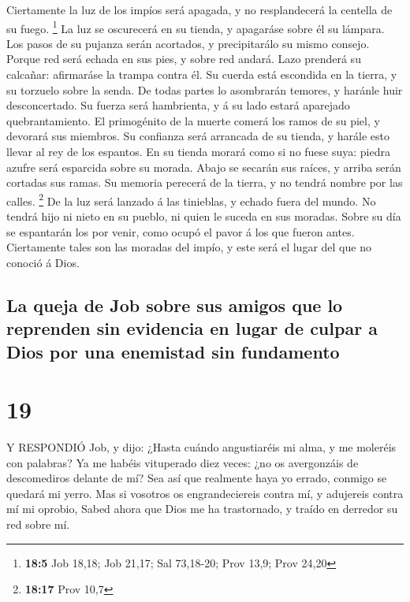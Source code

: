  Ciertamente la luz de los impíos será apagada, y no
resplandecerá la centella de su fuego. \footnote{\textbf{18:5} Job
  18,18; Job 21,17; Sal 73,18-20; Prov 13,9; Prov 24,20}  La
luz se oscurecerá en su tienda, y apagaráse sobre él su lámpara.
 Los pasos de su pujanza serán acortados, y precipitarálo su
mismo consejo.  Porque red será echada en sus pies, y sobre
red andará.  Lazo prenderá su calcañar: afirmaráse la trampa
contra él.  Su cuerda está escondida en la tierra, y su
torzuelo sobre la senda.  De todas partes lo asombrarán
temores, y haránle huir desconcertado.  Su fuerza será
hambrienta, y á su lado estará aparejado quebrantamiento. 
El primogénito de la muerte comerá los ramos de su piel, y devorará sus
miembros.  Su confianza será arrancada de su tienda, y
harále esto llevar al rey de los espantos.  En su tienda
morará como si no fuese suya: piedra azufre será esparcida sobre su
morada.  Abajo se secarán sus raíces, y arriba serán
cortadas sus ramas.  Su memoria perecerá de la tierra, y no
tendrá nombre por las calles. \footnote{\textbf{18:17} Prov 10,7}
 De la luz será lanzado á las tinieblas, y echado fuera del
mundo.  No tendrá hijo ni nieto en su pueblo, ni quien le
suceda en sus moradas.  Sobre su día se espantarán los por
venir, como ocupó el pavor á los que fueron antes. 
Ciertamente tales son las moradas del impío, y este será el lugar del
que no conoció á Dios.

\hypertarget{la-queja-de-job-sobre-sus-amigos-que-lo-reprenden-sin-evidencia-en-lugar-de-culpar-a-dios-por-una-enemistad-sin-fundamento}{%
\subsection{La queja de Job sobre sus amigos que lo reprenden sin
evidencia en lugar de culpar a Dios por una enemistad sin
fundamento}\label{la-queja-de-job-sobre-sus-amigos-que-lo-reprenden-sin-evidencia-en-lugar-de-culpar-a-dios-por-una-enemistad-sin-fundamento}}

\hypertarget{section-18}{%
\section{19}\label{section-18}}

 Y RESPONDIÓ Job, y dijo:  ¿Hasta cuándo
angustiaréis mi alma, y me moleréis con palabras?  Ya me
habéis vituperado diez veces: ¿no os avergonzáis de descomediros delante
de mí?  Sea así que realmente haya yo errado, conmigo se
quedará mi yerro.  Mas si vosotros os engrandeciereis contra
mí, y adujereis contra mí mi oprobio,  Sabed ahora que Dios
me ha trastornado, y traído en derredor su red sobre mí.

